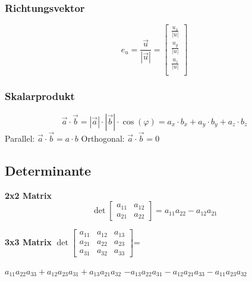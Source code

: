 \begin{minipage}[t]{0.33\linewidth}
    \subsubsection{Richtungsvektor }
    \[ e_u=\frac{\vec{u}}{|\vec{u}|} =
    \begin{bmatrix}
    \frac{u_x}{|u|}\\
    \frac{u_y}{|u|}\\
    \frac{u_z}{|u|}\\
    \end{bmatrix}\]  
\end{minipage}
\begin{minipage}[t]{0.33\linewidth}
    \subsubsection{Skalarprodukt }
    \[ \vec{a}\cdot \vec{b}= |\vec{a}|\cdot |\vec{b}| \cdot \cos(\varphi) = a_x \cdot b_x +  a_y \cdot b_y +  a_z \cdot b_z\]
    Parallel: $\vec{a}\cdot \vec{b} = a\cdot b$ \newline
    Orthogonal: $\vec{a}\cdot \vec{b} = 0$
\end{minipage}



\subsection{Determinante}
\begin{minipage}{9cm}
    
    	\textbf{2x2 Matrix}    
    $$ \det \begin{bmatrix} a_{11} & a_{12} \\
                            a_{21} & a_{22} \end{bmatrix} =
                            a_{11} a_{22} - a_{12} a_{21}  $$
\end{minipage}
\begin{minipage}{0.45\linewidth}
    	\textbf{3x3 Matrix}\newline
    $ \det \begin{bmatrix} a_{11} & a_{12} & a_{13} \\
    a_{21} & a_{22}& a_{23} \\
    a_{31} & a_{32} & a_{33} \end{bmatrix}
    $=\begin{minipage}{0.7\linewidth}
        $a_{11} a_{22} a_{33}
        + a_{12} a_{23} a_{31}
        + a_{13} a_{21} a_{32}$ \newline$
        - a_{13} a_{22} a_{31}
        - a_{12} a_{21} a_{33}
        - a_{11} a_{23} a_{32}  $
    \end{minipage} 
\end{minipage}	

